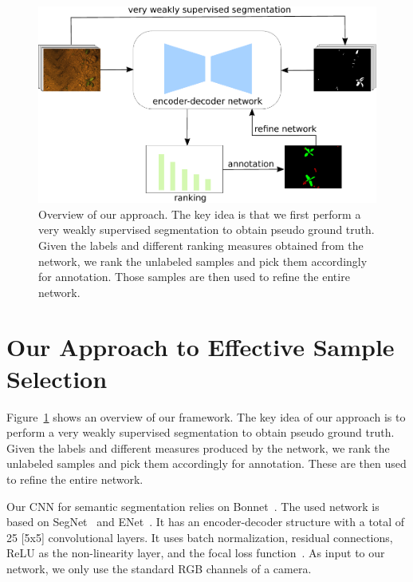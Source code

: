 \documentclass[letterpaper, 10 pt, conference]{ieeeconf}  %
\begin{document}
    \begin{figure}
    \vspace{1em}
    \centering
    \includegraphics[width=\linewidth]{pics/output_system_overview.pdf}
      \caption{Overview of our approach. The key idea is that we first
        perform a very weakly supervised segmentation to obtain pseudo
        ground truth. Given the labels and different ranking measures
        obtained from the network, we rank the unlabeled samples and pick them
        accordingly for annotation. Those samples are then used to refine the entire network.}
    \label{fig:overview}     
      \vspace{-0.5em}   
   \end{figure}


\section{Our Approach to Effective Sample Selection}
\label{sec:approach}

Figure~\ref{fig:overview} shows an overview of our framework.
The key idea of our approach is to perform a very weakly supervised segmentation to obtain pseudo ground truth. Given the labels and different measures produced by the network, we rank the unlabeled samples and pick them accordingly for annotation. These are then used to refine the entire network.


Our CNN for semantic segmentation relies on Bonnet~\cite{milioto2018bonnet}.
The used network is based on SegNet~\cite{badrinarayanan2017segnet} and ENet~\cite{paszke2016enet}. It has an encoder-decoder structure with a total of 25 [5x5] convolutional layers. It uses batch normalization, residual connections, ReLU as the non-linearity layer, and the focal loss function~\cite{DBLP:conf/iccv/LinGGHD17}.
As input to our network, we only use the standard RGB channels of a camera.
\end{document}
